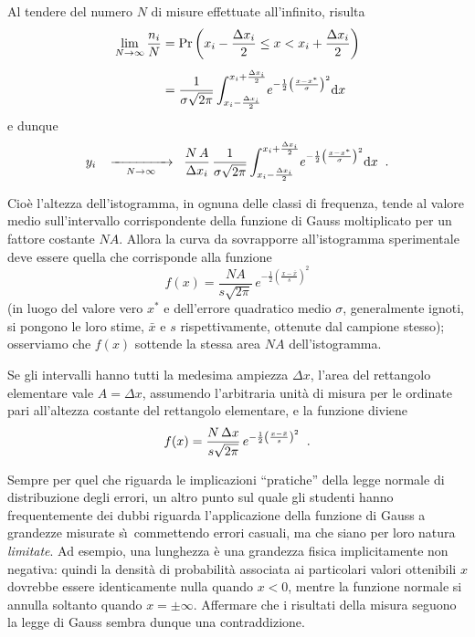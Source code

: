 %
Al tendere del numero $N$ di misure effettuate all'infinito,
risulta
\begin{align*}
  \lim_{N \rightarrow \infty} \frac{n_i}{N} &=
    \Pr \left( x_i - \frac{\Delta x_i}{2} \le x <
    x_i + \frac{\Delta x_i}{2} \right) \\[1ex]
  &= \frac{1}{\sigma \sqrt{2 \pi}}
    \int_{x_i - \frac{\Delta x_i}{2}}^{x_i
    + \frac{\Delta x_i}{2}} \! e^{- \frac{1}{2}
    \left( \frac{ x - x^* }{ \sigma } \right)^2 } \mathrm{d} x
\end{align*}
e dunque
\begin{equation*}
  y_i \;\;\; \xrightarrow[\quad N \to \infty \quad] \;\;\;
  \frac{N \, A}{\Delta x_i} \, \frac{1}{\sigma \sqrt{2 \pi}}
  \int_{x_i - \frac{\Delta x_i}{2}}^{x_i +
    \frac{\Delta x_i}{2}} \! e^{- \frac{1}{2}
    \left( \frac{x - x^*}{\sigma} \right) ^2} \mathrm{d} x \;\; .
\end{equation*}

Cio\`e l'altezza dell'istogramma, in ognuna delle classi di
frequenza, tende al valore medio sull'intervallo
corrispondente della funzione di Gauss moltiplicato per un
fattore costante $NA$.  Allora la curva da sovrapporre
all'istogramma sperimentale deve essere quella che
corrisponde alla funzione
\begin{equation*}
  f(x) = \frac{NA}{s \sqrt{2\pi}} \,
  e^{- \frac{1}{2} \left( \frac{x -
    \bar x}{s} \right) ^2 }
\end{equation*}
(in luogo del valore vero $x^*$ e dell'errore quadratico
medio $\sigma$, generalmente ignoti, si pongono le loro
stime, $\bar x$ e $s$ rispettivamente, ottenute dal campione
stesso); osserviamo che $f(x)$ sottende la stessa area $NA$
dell'istogramma.

Se gli intervalli hanno tutti la medesima ampiezza $\Delta
x$, l'area del rettangolo elementare vale $A = \Delta x$,
assumendo l'arbitraria unit\`a di misura per le ordinate
pari all'altezza costante del rettangolo elementare, e la
funzione diviene
\begin{equation*}
  f(x) = \frac{N \, \Delta x}{s \sqrt{2\pi}} \,
  e^{- \frac{1}{2} \left( \frac{x -
    \bar x}{s} \right) ^2 } \;\; .
\end{equation*}%
%

Sempre per quel che riguarda le implicazioni ``pratiche''
della legge normale di distribuzione degli errori, un altro
punto sul quale gli studenti hanno frequentemente dei dubbi
riguarda l'applicazione della funzione di Gauss a grandezze
misurate s\`\i\ commettendo errori casuali, ma che siano per
loro natura \emph{limitate}.  Ad esempio, una lunghezza \`e
una grandezza fisica implicitamente non negativa: quindi la
densit\`a di probabilit\`a associata ai particolari valori
ottenibili $x$ dovrebbe essere identicamente nulla quando $x
< 0$, mentre la funzione normale si annulla soltanto quando
$x = \pm \infty$.  Affermare che i risultati della misura
seguono la legge di Gauss sembra dunque una contraddizione.

